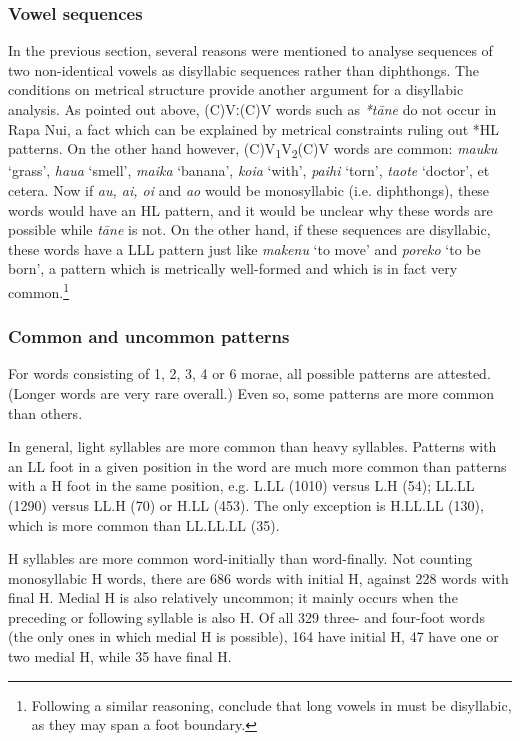 \subsubsection{Vowel sequences}\label{sec:2.3.2.3}

In the previous section, several reasons were mentioned to analyse sequences of two non-identical vowels as disyllabic sequences rather than diphthongs. The conditions on metrical structure provide another argument for a disyllabic analysis. As pointed out above, (C)Vː(C)V words such as \textit{*tāne} do not occur in Rapa Nui, a fact which can be explained by metrical constraints ruling out *HL patterns. On the other hand however, (C)V\textsubscript{1}V\textsubscript{2}(C)V words are common: \textit{mauku} ‘grass’, \textit{hau{\ꞌ}a} ‘smell’, \textit{maika} ‘banana’, \textit{koia} ‘with’, \textit{paihi} ‘torn’, \textit{taote} ‘doctor’, et cetera. Now if \textit{au, ai, oi} and \textit{ao} would be monosyllabic (i.e. diphthongs), these words would have an HL pattern, and it would be unclear why these words are possible while \textit{tāne} is not. On the other hand, if these sequences are disyllabic, these words have a LLL pattern just like \textit{makenu} ‘to move’ and \textit{poreko} ‘to be born’, a pattern which is metrically well-formed and which is in fact very common.\footnote{\label{fn:50}Following a similar reasoning, \citet{AndersonOtsuka2006} conclude that long vowels in  must be disyllabic, as they may span a foot boundary.} 

\subsubsection{Common and uncommon patterns}\label{sec:2.3.2.4}

For words consisting of 1, 2, 3, 4 or 6 morae, all possible patterns are attested. (Longer words are very rare overall.) Even so, some patterns are more common than others.

In general, light syllables are more common than heavy syllables. Patterns with an LL foot in a given position in the word are much more common than patterns with a H foot in the same position, e.g. L.LL (1010) versus L.H (54); LL.LL (1290) versus LL.H (70) or H.LL (453). The only exception is H.LL.LL (130), which is more common than LL.LL.LL (35).

H syllables are more common word-initially than word-finally. Not counting monosyllabic H words, there are 686 words with initial H, against 228 words with final H. Medial H is also relatively uncommon; it mainly occurs when the preceding or following syllable is also H. Of all 329 three- and four-foot words (the only ones in which medial H is possible), 164 have initial H, 47 have one or two medial H, while 35 have final H.

